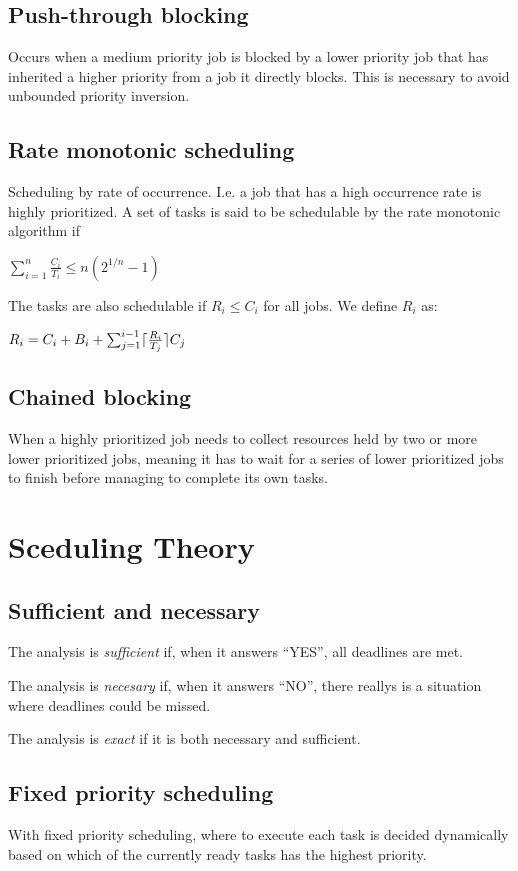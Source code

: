 \documentclass[a4paper]{article}
\DeclarePairedDelimiter{\ceil}{\lceil}{\rceil}
\begin{document}
\subsection{Push-through blocking}
Occurs when a medium priority job is blocked by a lower priority job that has
inherited a higher priority from a job it directly blocks. This is necessary
to avoid unbounded priority inversion.

\subsection{Rate monotonic scheduling}
Scheduling by rate of occurrence. I.e. a job that has a high occurrence rate is
highly prioritized. A set of tasks is said to be schedulable by the rate monotonic 
algorithm if 
\begin{center}
  $\sum_{i=1}^{n} \frac{C_i}{T_i} \leq n(2^{1/n}-1)$
\end{center}

The tasks are also schedulable if $R_i \leq C_i$ for all jobs. We define $R_i$ as:

\begin{center}
  $R_i = C_i + B_i + \sum_{j=1}^{i-1} \ceil{\frac{R_i}{T_j}}C_j$
\end{center}

\subsection{Chained blocking}
When a highly prioritized job needs to collect resources held by two or more
lower prioritized jobs, meaning it has to wait for a series of lower prioritized
jobs to finish before managing to complete its own tasks.

\section{Sceduling Theory}
\subsection{Sufficient and necessary}
The analysis is \emph{sufficient} if, when it answers ``YES'', all deadlines
are met.

The analysis is \emph{necesary} if, when it answers ``NO'', there reallys is a
situation where deadlines could be missed.

The analysis is \emph{exact} if it is both necessary and sufficient.

\subsection{Fixed priority scheduling}
With fixed priority scheduling, where to execute each task is decided
dynamically based on which of the currently ready tasks has the highest
priority.
\end{document}
